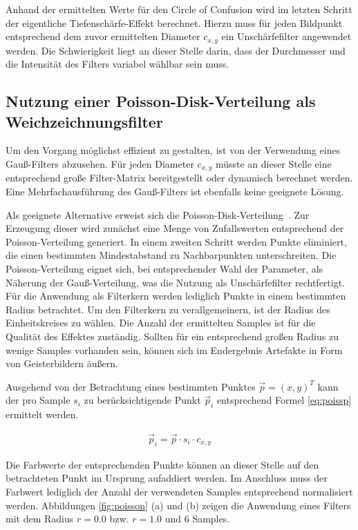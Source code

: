 \documentclass{acmsiggraph}                     %
\begin{document}
Anhand der ermittelten Werte für den Circle of Confusion wird im letzten Schritt der eigentliche Tiefenschärfe-Effekt berechnet. Hierzu muss für jeden Bildpunkt entsprechend dem zuvor ermittelten Diameter $c_{x,y}$ ein Unschärfefilter angewendet werden. Die Schwierigkeit liegt an dieser Stelle darin, dass der Durchmesser und die Intensität des Filters variabel wählbar sein muss.

\subsection{Nutzung einer Poisson-Disk-Verteilung als Weichzeichnungsfilter}

Um den Vorgang möglichst effizient zu gestalten, ist von der Verwendung eines Gauß-Filters abzusehen. Für jeden Diameter $c_{x,y}$ müsste an dieser Stelle eine entsprechend große Filter-Matrix bereitgestellt oder dynamisch berechnet werden. Eine Mehrfachausführung des Gauß-Filters ist ebenfalls keine geeignete Lösung.

Als geeignete Alternative erweist sich die Poisson-Disk-Verteilung~\cite{Engel:2004uq}. Zur Erzeugung dieser wird zunächst eine Menge von Zufallswerten entsprechend der Poisson-Verteilung generiert. In einem zweiten Schritt werden Punkte eliminiert, die einen bestimmten Mindestabstand zu Nachbarpunkten unterschreiten. Die Poisson-Verteilung eignet sich, bei entsprechender Wahl der Parameter, als Näherung der Gauß-Verteilung, was die Nutzung als Unschärfefilter rechtfertigt. Für die Anwendung als Filterkern werden lediglich Punkte in einem bestimmten Radius betrachtet. Um den Filterkern zu verallgemeinern, ist der Radius des Einheitskreises zu wählen. Die Anzahl der ermittelten Samples ist für die Qualität des Effektes zuständig. Sollten für ein entsprechend großen Radius zu wenige Samples vorhanden sein, können sich im Endergebnis Artefakte in Form von Geisterbildern äußern.

Ausgehend von der Betrachtung eines bestimmten Punktes $\vec{p} = \left(x,y\right)^T$ kann der pro Sample $s_{i}$ zu berücksichtigende Punkt $\vec{p}_i$ entsprechend Formel \ref{eq:poissp} ermittelt werden.

\begin{align}
	 \label{eq:poissp}
	\vec{p}_i = \vec{p} \cdot s_i \cdot c_{x,y}
\end{align}

Die Farbwerte der entsprechenden Punkte können an dieser Stelle auf den betrachteten Punkt im Ursprung aufaddiert werden. Im Anschluss muss der Farbwert lediglich der Anzahl der verwendeten Samples entsprechend normalisiert werden. Abbildungen \ref{fig:poisson} (a) und (b) zeigen die Anwendung eines Filters mit dem Radius $r = 0.0$ bzw. $r = 1.0$ und 6 Samples.
\end{document}
